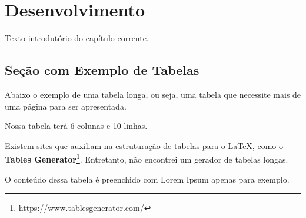 \chapter{Desenvolvimento}

Texto introdutório do capítulo corrente.

\section{Seção com Exemplo de Tabelas} \label{sec:tabela}

Abaixo o exemplo de uma tabela longa, ou seja, uma tabela que necessite mais de uma página para ser apresentada.

Nossa tabela terá 6 colunas e 10 linhas.

Existem sites que auxiliam na estruturação de tabelas para o LaTeX, como o \textbf{Tables Generator}\footnote{\url{https://www.tablesgenerator.com/}}. Entretanto, não encontrei um gerador de tabelas longas.

O conteúdo dessa tabela é preenchido com Lorem Ipsum apenas para exemplo.

\renewcommand*{\arraystretch}{1.5}

